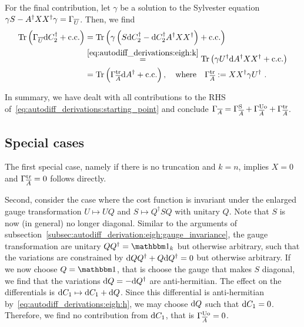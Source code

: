 For the final contribution, let $\gamma$ be a solution to the Sylvester equation $\gamma S - A^\dagger XX^\dagger \gamma = \Gamma_{\overline{U}}$.
%
Then, we find
\begin{align}
    \begin{split}
        \tr{\Gconj{U} \dC_2^\dagger \pcc}
        &= \tr{\gamma \rBr{S \dC_2^\dagger - \dC_2^\dagger A^\dagger XX^\dagger} \pcc}
        \\
        &\overset{\eqref{eq:autodiff_derivations:eigh:k}}{=}
        \tr{\gamma U^\dagger \dA^\dagger X X^\dagger \pcc}
        \\
        &= \tr{\GcAtr \dA^\dagger\pcc}
        ,
        \quad\text{where}\quad
        \GcAtr := X X^\dagger \gamma U^\dagger
        ~.
    \end{split}
\end{align}

In summary, we have dealt with all contributions to the RHS of~\eqref{eq:autodiff_derivations:starting_point} and conclude $\Gamma_{\overline{A}} = \Gamma_{\overline{A}}^\mathrm{S} + \Gamma_{\overline{A}}^\mathrm{Uo} + \Gamma_{\overline{A}}^\mathrm{tr}$.


\subsection{Special cases}

The first special case, namely if there is no truncation and $k = n$, implies $X = 0$ and $\Gamma_{\overline{A}}^\mathrm{tr} = 0$ follows directly.

Second, consider the case where the cost function is invariant under the enlarged gauge transformation $U \mapsto U Q$ and $S \mapsto Q^\dagger S Q$ with unitary $Q$.
%
Note that $S$ is now (in general) no longer diagonal.
%
Similar to the arguments of subsection~\ref{subsec:autodiff_derivation:eigh:gauge_invariance}, the gauge transformation are unitary $QQ^\dagger = \eye_k$ but otherwise arbitrary, such that the variations are constrained by $\mathrm{d}{Q} Q^\dagger + Q \mathrm{d}{Q}^\dagger = 0$ but otherwise arbitrary.
%
If we now choose $Q = \eye$, that is choose the gauge that makes $S$ diagonal, we find that the variations $\mathrm{d}{Q} = - \mathrm{d}{Q}^\dagger$ are anti-hermitian.
%
The effect on the differentials is $\mathrm{d}{C}_1 \mapsto \mathrm{d}{C}_1 + \mathrm{d}{Q}$.
%
Since this differential is anti-hermitian by~\eqref{eq:autodiff_derivations:eigh:h}, we may choose $\mathrm{d}{Q}$ such that $\mathrm{d}{C}_1 = 0$.
%
Therefore, we find no contribution from $\mathrm{d}{C}_1$, that is $\Gamma_{\overline{A}}^\mathrm{Uo} = 0$.

